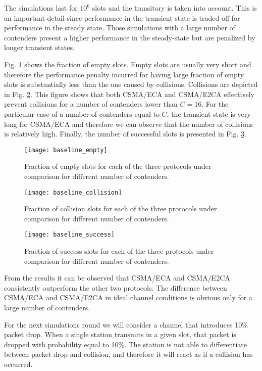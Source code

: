 \documentclass[journal]{IEEEtran}
\begin{document}
The simulations last for $10^6$ slots and the transitory is taken into account. This is an important detail since performance in the transient state is traded off for performance in the steady state. Those simulations with a large number of contenders present a higher performance in the steady-state but are penalized by longer transient states.

Fig. \ref{fig:baseline_empty} shows the fraction of empty slots. Empty slots are usually very short and therefore the performance penalty incurred for having large fraction of empty slots is substantially less than the one caused by collisions. Collisions are depicted in Fig. \ref{fig:baseline_collision}. This figure shows that both CSMA/ECA and CSMA/E2CA effectively prevent collisions for a number of contenders lower than $C=16$. For the particular case of a number of contenders equal to $C$, the transient state is very long for CSMA/ECA and therefore we can observe that the number of collisions is relatively high. Finally, the number of successful slots is presented in Fig. \ref{fig:baseline_success}.

\begin{figure}[!t]
\centering
\texttt{[image: baseline\_empty]}
\caption{Fraction of empty slots for each of the three protocols under comparison for different number of contenders.}
\label{fig:baseline_empty}
\end{figure}

\begin{figure}[!t]
\centering
\texttt{[image: baseline\_collision]}
\caption{Fraction of collision slots for each of the three protocols under comparison for different number of contenders.}
\label{fig:baseline_collision}
\end{figure}


\begin{figure}[!t]
\centering
\texttt{[image: baseline\_success]}
\caption{Fraction of success slots for each of the three protocols under comparison for different number of contenders.}
\label{fig:baseline_success}
\end{figure}

From the results it can be observed that CSMA/ECA and CSMA/E2CA consistently outperform the other two protocols. The difference between CSMA/ECA and CSMA/E2CA in ideal channel conditions is obvious only for a large number of contenders.

For the next simulations round we will consider a channel that introduces 10\% packet drop. When a single station transmits in a given slot, that packet is dropped with probability equal to 10\%. The station is not able to differentiate between packet drop and collision, and therefore it will react as if a collision has occurred.
\end{document}

